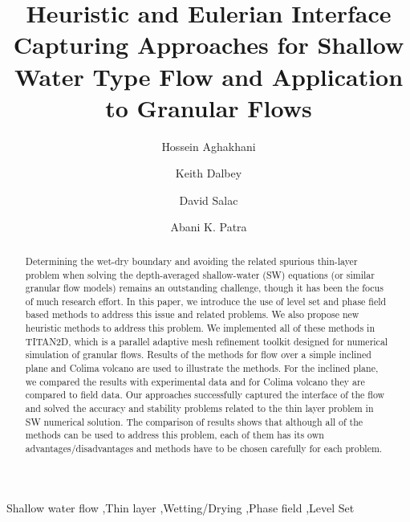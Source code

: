 \documentclass[review]{elsarticle}
\begin{document}
\begin{frontmatter}

\title{Heuristic and Eulerian Interface Capturing Approaches for Shallow Water Type Flow and Application to Granular Flows}


\author[maeaddress]{Hossein Aghakhani}
\author[sandiaaddress]{Keith Dalbey}
\author[maeaddress]{David Salac}
\author[maeaddress]{Abani K. Patra}


\address[maeaddress]{Department of Mechanical and Aerospace Engineering, University at Buffalo, Buffalo, New York, United States}
\address[sandiaaddress]{Sandia National Laboratories, Albuquerque, New Mexico, United States}

\begin{abstract}
Determining the wet-dry boundary and avoiding the related spurious thin-layer problem when 
solving the depth-averaged shallow-water (SW) equations (or similar granular flow models) remains an outstanding challenge, though it  has 
been the focus of much research effort. In this paper, we introduce the use of level set and phase field based methods to address this issue and related problems. We also propose new heuristic 
methods to address this problem. We implemented all of these methods in TITAN2D, which is a parallel adaptive mesh refinement toolkit designed for numerical simulation of granular flows. 
Results of the methods for flow over a simple inclined plane and Colima volcano are used to illustrate the methods. For the inclined plane,
 we compared the results with experimental data and for Colima volcano they are compared to field data. Our approaches successfully captured the interface of the flow and solved the accuracy and stability problems related to the thin layer problem in 
SW numerical solution. The comparison of results shows that although all of the methods can be used to address this problem, 
each of them has its own advantages/disadvantages and methods have to be chosen carefully for each problem. 
\end{abstract}

\begin{keyword}

Shallow water flow \sep Thin layer \sep Wetting/Drying \sep Phase field \sep Level Set

\end{keyword}
\end{frontmatter}
\end{document}
